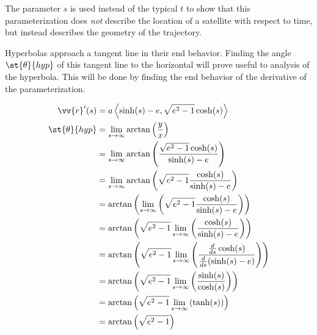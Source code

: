 \documentclass[../basicOrbitalDynamics.tex]{subfiles}
\begin{document}
The parameter $s$ is used instead of the typical $t$ to show that this parameterization does \textit{not} describe the location of a satellite with respect to time, but instead describes the geometry of the trajectory.

Hyperbolas approach a tangent line in their end behavior. Finding the angle $\st{\theta}{hyp}$ of this tangent line to the horizontal will prove useful to analysis of the hyperbola. This will be done by finding the end behavior of the derivative of the parameterization.

\begin{align*}
    \vv{r}'(s)        & =a\left\langle\sinh(s)-e, \sqrt{e^2-1}\cosh(s)\right\rangle                                                                  \\
    \st{\theta}{hyp} & =\lim_{s\rightarrow\infty}\arctan\left(\frac{y}{x}\right)                                                                    \\
                      & =\lim_{s\rightarrow\infty}\arctan\left(\frac{\sqrt{e^2-1}\cosh(s)}{\sinh(s)-e}\right)                                        \\
                      & =\lim_{s\rightarrow\infty}\arctan\left(\sqrt{e^2-1}\frac{\cosh(s)}{\sinh(s)-e}\right)                                        \\
                      & =\arctan\left(\lim_{s\rightarrow\infty}\left(\sqrt{e^2-1}\frac{\cosh(s)}{\sinh(s)-e}\right)\right)                           \\
                      & =\arctan\left(\sqrt{e^2-1}\lim_{s\rightarrow\infty}\left(\frac{\cosh(s)}{\sinh(s)-e}\right)\right)                           \\
                      & =\arctan\left(\sqrt{e^2-1}\lim_{s\rightarrow\infty}\left(\frac{\frac{d}{ds}\cosh(s)}{\frac{d}{ds}(\sinh(s)-e)}\right)\right) \\
                      & =\arctan\left(\sqrt{e^2-1}\lim_{s\rightarrow\infty}\left(\frac{\sinh(s)}{\cosh(s)}\right)\right)                             \\
                      & =\arctan\left(\sqrt{e^2-1}\lim_{s\rightarrow\infty}\left(\tanh(s)\right)\right)                                              \\
                      & =\arctan\left(\sqrt{e^2-1}\right)                                                                                            \\
\end{align*}
\end{document}

